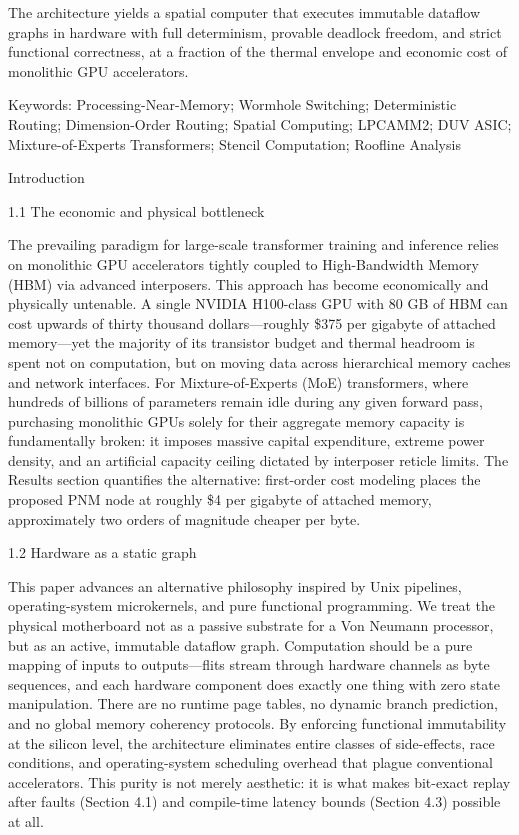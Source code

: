 \documentclass[10pt,twocolumn]{article}
\begin{document}
The architecture yields a spatial computer that executes immutable dataflow graphs in hardware with full determinism, provable deadlock freedom, and strict functional correctness, at a fraction of the thermal envelope and economic cost of monolithic GPU accelerators.

Keywords: Processing-Near-Memory; Wormhole Switching; Deterministic Routing; Dimension-Order Routing; Spatial Computing; LPCAMM2; DUV ASIC; Mixture-of-Experts Transformers; Stencil Computation; Roofline Analysis

Introduction

1.1 The economic and physical bottleneck

The prevailing paradigm for large-scale transformer training and inference relies on monolithic GPU accelerators tightly coupled to High-Bandwidth Memory (HBM) via advanced interposers\cite{2,15}. This approach has become economically and physically untenable. A single NVIDIA H100-class GPU with 80 GB of HBM can cost upwards of thirty thousand dollars---roughly \$375 per gigabyte of attached memory---yet the majority of its transistor budget and thermal headroom is spent not on computation, but on moving data across hierarchical memory caches and network interfaces\cite{2}. For Mixture-of-Experts (MoE) transformers, where hundreds of billions of parameters remain idle during any given forward pass\cite{3,4}, purchasing monolithic GPUs solely for their aggregate memory capacity is fundamentally broken: it imposes massive capital expenditure, extreme power density, and an artificial capacity ceiling dictated by interposer reticle limits. The Results section quantifies the alternative: first-order cost modeling places the proposed PNM node at roughly \$4 per gigabyte of attached memory, approximately two orders of magnitude cheaper per byte.

1.2 Hardware as a static graph

This paper advances an alternative philosophy inspired by Unix pipelines, operating-system microkernels, and pure functional programming\cite{6,7,8}. We treat the physical motherboard not as a passive substrate for a Von Neumann processor, but as an active, immutable dataflow graph. Computation should be a pure mapping of inputs to outputs---flits stream through hardware channels as byte sequences, and each hardware component does exactly one thing with zero state manipulation. There are no runtime page tables, no dynamic branch prediction, and no global memory coherency protocols. By enforcing functional immutability at the silicon level, the architecture eliminates entire classes of side-effects, race conditions, and operating-system scheduling overhead that plague conventional accelerators. This purity is not merely aesthetic: it is what makes bit-exact replay after faults (Section 4.1) and compile-time latency bounds (Section 4.3) possible at all.
\end{document}
